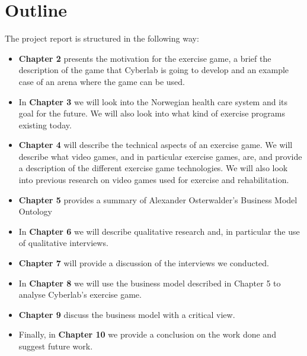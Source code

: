 \section{Outline}
The project report is structured in the following way:
\begin{itemize}
\renewcommand{\labelitemi}{$\bullet$}
\item \textbf{Chapter 2} presents the motivation for the exercise game, a brief the description of the game that Cyberlab is going to develop and an example case of an arena where the game can be used.
\item In \textbf{Chapter 3} we will look into the Norwegian health care system and its goal for the future. We will also look into what kind of exercise programs existing today.
\item	\textbf{Chapter 4} will describe the technical aspects of an exercise game. We will describe what video games, and in particular exercise games, are, and provide a description of the different exercise game technologies. We will also look into previous research on video games used for exercise and rehabilitation.
\item	\textbf{Chapter 5} provides a summary of Alexander Osterwalder's Business Model Ontology
\item	In \textbf{Chapter 6} we will describe qualitative research and, in particular the use of qualitative interviews. 
\item	\textbf{Chapter 7} will provide a discussion of the interviews we conducted.
\item In \textbf{Chapter 8} we will use the business model described in Chapter 5 to analyse Cyberlab's exercise game.
\item  \textbf{Chapter 9} discuss the business model with a critical view.
\item Finally, in \textbf{Chapter 10} we provide a conclusion on the work done and suggest future work.
\end{itemize}
